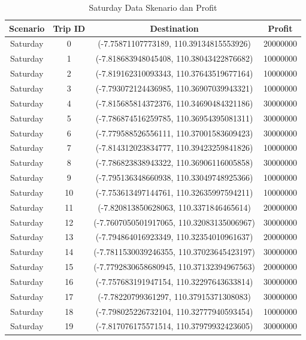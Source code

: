 \documentclass{skripsimathugm}
\begin{document}
\begin{table}[H]
\centering
\caption{Saturday Data Skenario dan Profit}
\label{Saturday Data Skenario dan Profit}
\begin{tabular}{|c|c|c|c|}
\hline
\textbf{Scenario} & \textbf{Trip ID} & \textbf{Destination} & \textbf{Profit} \\
\hline

Saturday & 0 & (-7.75871107773189, 110.39134815553926) & 20000000 \\
Saturday & 1 & (-7.818683948045408, 110.38043422876682) & 10000000 \\
Saturday & 2 & (-7.819162310093343, 110.37643519677164) & 10000000 \\
Saturday & 3 & (-7.793072124436985, 110.36907039943321) & 10000000 \\
Saturday & 4 & (-7.815685814372376, 110.34690484321186) & 30000000 \\
Saturday & 5 & (-7.786874516259785, 110.36954395081311) & 30000000 \\
Saturday & 6 & (-7.779588526556111, 110.37001583609423) & 30000000 \\
Saturday & 7 & (-7.814312023834777, 110.39423259841826) & 10000000 \\
Saturday & 8 & (-7.786823838943322, 110.36906116005858) & 30000000 \\
Saturday & 9 & (-7.795136348660938, 110.33049748925366) & 10000000 \\
Saturday & 10 & (-7.753613497144761, 110.32635997594211) & 10000000 \\
Saturday & 11 & (-7.820813850628063, 110.3371846465614) & 20000000 \\
Saturday & 12 & (-7.7607050501917065, 110.32083135006967) & 30000000 \\
Saturday & 13 & (-7.794864016923349, 110.32354010961637) & 20000000 \\
Saturday & 14 & (-7.7811530039246355, 110.37023645423197) & 30000000 \\
Saturday & 15 & (-7.7792830658680945, 110.37132394967563) & 20000000 \\
Saturday & 16 & (-7.757683191947154, 110.32297643633814) & 30000000 \\
Saturday & 17 & (-7.78220799361297, 110.37915371308083) & 30000000 \\
Saturday & 18 & (-7.798025226732104, 110.32777940593454) & 10000000 \\
Saturday & 19 & (-7.817076175571514, 110.37979932423605) & 30000000 \\

\end{tabular}
\end{table}
\end{document}
